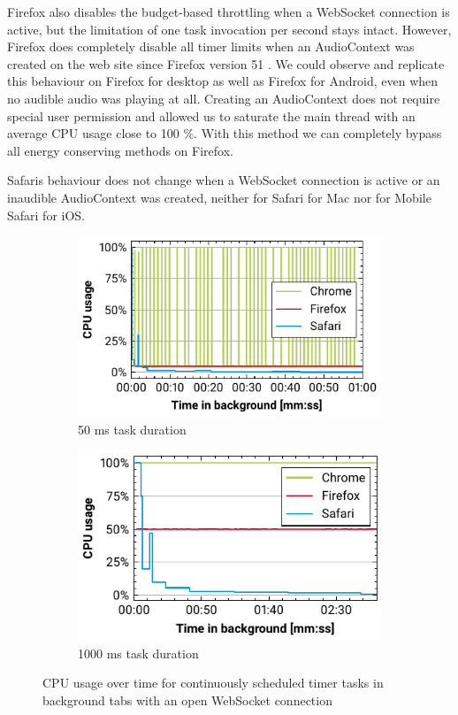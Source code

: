 \documentclass[
	ruledheaders=section,%
	class=report,%
	thesis={type=bachelor},%
	accentcolor=9c,%
	custommargins=true,%
	marginpar=false,%
	parskip=half-,%
	fontsize=11pt,%
]{tudapub}
\begin{document}
  Firefox also disables the budget-based throttling when a WebSocket connection is active, but the limitation of one task invocation per second stays intact. However, Firefox does completely disable all timer limits when an AudioContext was created on the web site since Firefox version 51 \cite{firefox-audiocontext-exemption}. We could observe and replicate this behaviour on Firefox for desktop as well as Firefox for Android, even when no audible audio was playing at all. Creating an AudioContext does not require special user permission and allowed us to saturate the main thread with an average CPU usage close to 100 \%. With this method we can completely bypass all energy conserving methods on Firefox.

  Safaris behaviour does not change when a WebSocket connection is active or an inaudible AudioContext was created, neither for Safari for Mac nor for Mobile Safari for iOS.

  \begin{figure}
    \begin{subfigure}[t]{0.5\textwidth}
      \includegraphics[width=\textwidth]{images/websocket-50.pdf}
      \caption{50 ms task duration}
    \end{subfigure}
    \hfill
    \begin{subfigure}[t]{0.5\textwidth}
      \includegraphics[width=\textwidth]{images/websocket-1000.pdf}
      \caption{1000 ms task duration}
    \end{subfigure}

    \caption{CPU usage over time for continuously scheduled timer tasks in background tabs with an open WebSocket connection}
    \label{fig:websocket}
  \end{figure}
\end{document}
